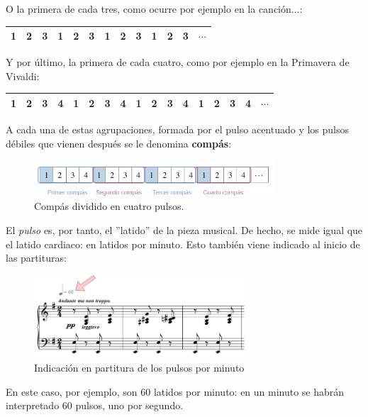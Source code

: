 \documentclass[a4paper, openright, 11pt, titlepage]{report}
\theoremstyle{definition}\newtheorem{defin}[propo]{Definition}
\theoremstyle{definition}\newtheorem{obser}[propo]{Remark}
\theoremstyle{definition}\newtheorem{ejem}[propo]{Ejemplo}
\theoremstyle{definition}\newtheorem{algoritmo}[propo]{Algoritmo}
\begin{document}
O la primera de cada tres, como ocurre por ejemplo en la canción...:
\begin{table}[H]
    \centering
    \begin{tabular}{|c|c|c|c|c|c|c|c|c|c|c|c|c|}
    \hline
        \cellcolor{acento}1 & 2 & 3 & \cellcolor{acento}1 & 2 & 3 & \cellcolor{acento}1 & 2 & 3 & \cellcolor{acento}1 & 2 & 3 & $\cdots$ \\
    \hline
    \end{tabular}
\end{table}
Y por último, la primera de cada cuatro, como por ejemplo en la Primavera de Vivaldi:
\begin{table}[H]
    \centering
    \begin{tabular}{|c|c|c|c|c|c|c|c|c|c|c|c|c|c|c|c|c|}
    \hline
        \cellcolor{acento}1 & 2 & 3 & 4 & \cellcolor{acento}1 & 2 & 3 & 4 & \cellcolor{acento}1 & 2 & 3 & 4 & \cellcolor{acento}1 & 2 & 3 & 4 & $\cdots$ \\
    \hline
    \end{tabular}
\end{table}
A cada una de estas agrupaciones, formada por el pulso acentuado y los pulsos débiles que vienen después se le denomina \textbf{compás}:
\begin{figure}[H]
    \centering
    \includegraphics[width = 0.8\textwidth]{compases.png}
    \caption{Compás dividido en cuatro pulsos.}
\end{figure}
El \textit{pulso} es, por tanto, el ''latido'' de la pieza musical. De hecho, se mide igual que el latido cardiaco: en latidos por minuto. Esto también viene indicado al inicio de las partituras:
\begin{figure}[H]
    \centering
    \includegraphics[width = 0.7\textwidth]{tempo2.png}
    \caption{Indicación en partitura de los pulsos por minuto}
\end{figure}
En este caso, por ejemplo, son 60 latidos por minuto: en un minuto se habrán interpretado 60 pulsos, uno por segundo.\\\\
\end{document}

